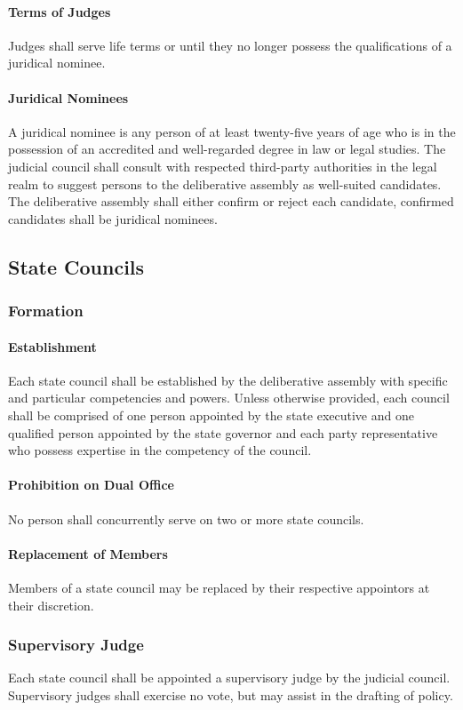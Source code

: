 \documentclass{article}
\begin{document}
\paragraph{Terms of Judges}
Judges shall serve life terms or until they no longer possess the qualifications of a juridical nominee.
\paragraph{Juridical Nominees}
A juridical nominee is any person of at least twenty-five years of age who is in the possession of an accredited and well-regarded degree in law or legal studies. The judicial council shall consult with respected third-party authorities in the legal realm to suggest persons to the deliberative assembly as well-suited candidates. The deliberative assembly shall either confirm or reject each candidate, confirmed candidates shall be juridical nominees.
\subsection{State Councils}
\subsubsection{Formation}
\paragraph{Establishment}
Each state council shall be established by the deliberative assembly with specific and particular competencies and powers. Unless otherwise provided, each council shall be comprised of one person appointed by the state executive and one qualified person appointed by the state governor and each party representative who possess expertise in the competency of the council. 
\paragraph{Prohibition on Dual Office}
No person shall concurrently serve on two or more state councils.
\paragraph{Replacement of Members}
Members of a state council may be replaced by their respective appointors at their discretion.
\subsubsection{Supervisory Judge}
Each state council shall be appointed a supervisory judge by the judicial council. Supervisory judges shall exercise no vote, but may assist in the drafting of policy.
\end{document}
